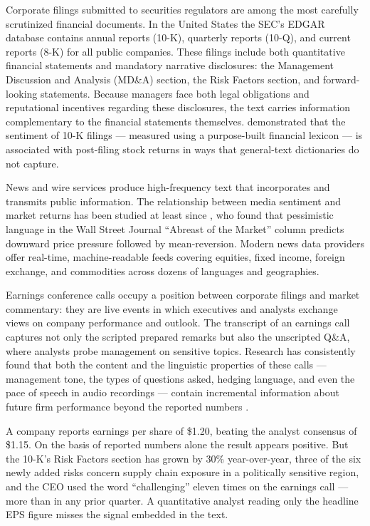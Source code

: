 Corporate filings submitted to securities regulators are among the most
carefully scrutinized financial documents.  In the United States the SEC's
EDGAR database contains annual reports (10-K), quarterly reports (10-Q),
and current reports (8-K) for all public companies.  These filings include
both quantitative financial statements and mandatory narrative disclosures:
the Management Discussion and Analysis (MD\&A) section, the Risk Factors
section, and forward-looking statements.  Because managers face both legal obligations and reputational incentives
regarding these disclosures, the text carries information complementary
to the financial statements themselves.  \textcite{loughran2011liability}
demonstrated that the sentiment of 10-K filings --- measured using a
purpose-built financial lexicon --- is associated with post-filing stock
returns in ways that general-text dictionaries do not capture.

News and wire services produce high-frequency text that incorporates and
transmits public information.  The relationship between media sentiment
and market returns has been studied at least since \textcite{tetlock2007giving},
who found that pessimistic language in the Wall Street Journal ``Abreast of
the Market'' column predicts downward price pressure followed by
mean-reversion.  Modern news data providers offer real-time, machine-readable
feeds covering equities, fixed income, foreign exchange, and commodities
across dozens of languages and geographies.

Earnings conference calls occupy a position between corporate filings and
market commentary: they are live events in which executives and analysts
exchange views on company performance and outlook.  The transcript of an
earnings call captures not only the scripted prepared remarks but also
the unscripted Q\&A, where analysts probe management on sensitive topics.
Research has consistently found that both the content and the linguistic
properties of these calls --- management tone, the types of questions
asked, hedging language, and even the pace of speech in audio recordings
--- contain incremental information about future firm performance beyond
the reported numbers \parencite{loughran2020textual}.

\begin{example}
\label{ex:financial-text-info}
A company reports earnings per share of \$1.20, beating the analyst
consensus of \$1.15.  On the basis of reported numbers alone the result
appears positive.  But the 10-K's Risk Factors section has grown by
30\% year-over-year, three of the six newly added risks concern supply
chain exposure in a politically sensitive region, and the CEO used the
word ``challenging'' eleven times on the earnings call --- more than in
any prior quarter.  A quantitative analyst reading only the headline EPS
figure misses the signal embedded in the text.
\end{example}

